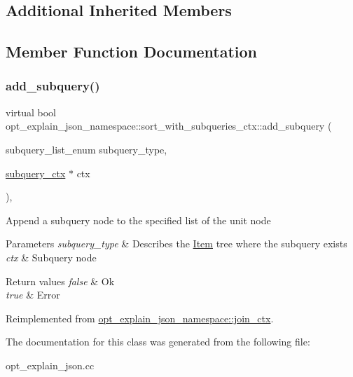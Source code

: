 \subsection*{Additional Inherited Members}


\subsection{Member Function Documentation}
\mbox{\label{classopt__explain__json__namespace_1_1sort__with__subqueries__ctx_a57c77821336044d261cca101925dfdf2}} 
\subsubsection{\texorpdfstring{add\+\_\+subquery()}{add\_subquery()}}
{\footnotesize\ttfamily virtual bool opt\+\_\+explain\+\_\+json\+\_\+namespace\+::sort\+\_\+with\+\_\+subqueries\+\_\+ctx\+::add\+\_\+subquery (\begin{DoxyParamCaption}\item[{subquery\+\_\+list\+\_\+enum}]{subquery\+\_\+type,  }\item[{\mbox{\hyperlink{classopt__explain__json__namespace_1_1subquery__ctx}{subquery\+\_\+ctx}} $\ast$}]{ctx }\end{DoxyParamCaption})\hspace{0.3cm}{\ttfamily [inline]}, {\ttfamily [virtual]}}

Append a subquery node to the specified list of the unit node


\begin{DoxyParams}{Parameters}
{\em subquery\+\_\+type} & Describes the \mbox{\hyperlink{classItem}{Item}} tree where the subquery exists \\
\hline
{\em ctx} & Subquery node\\
\hline
\end{DoxyParams}

\begin{DoxyRetVals}{Return values}
{\em false} & Ok \\
\hline
{\em true} & Error \\
\hline
\end{DoxyRetVals}


Reimplemented from \mbox{\hyperlink{classopt__explain__json__namespace_1_1join__ctx_a5005892466618a6abcc3a5971c1d7433}{opt\+\_\+explain\+\_\+json\+\_\+namespace\+::join\+\_\+ctx}}.



The documentation for this class was generated from the following file\+:\begin{DoxyCompactItemize}
\item 
opt\+\_\+explain\+\_\+json.\+cc\end{DoxyCompactItemize}
